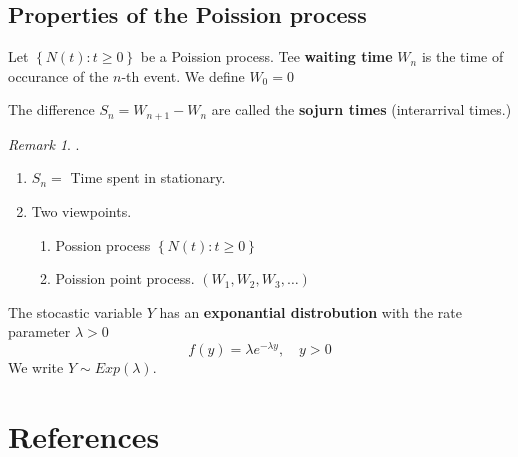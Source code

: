 \documentclass{article}
\theoremstyle{remark}
\newtheorem*{remark}{Remark}
\newcommand{\newpara}
  {
  \vskip 0.4cm
  }
\begin{document}
\subsection{Properties of the Poission process}%
\label{sub:properties_of_the_poission_process}

\begin{definition}
  Let $\left\{ N\left( t \right): t \ge 0 \right\}$ be a Poission process.  Tee \textbf{waiting time } $W_{n}$  is the time of occurance of the $n$-th event. We define $W_{0} = 0$
\end{definition}

\begin{definition}
  The difference $S_{n} = W_{n+1} - W_{n}$ are called the \textbf{sojurn times }  (interarrival times.)
\end{definition}

\begin{remark}.
 \newpara
  \begin{enumerate}[label=(\roman*)]
    \item $\displaystyle S_{n} = $ Time spent in stationary.
    \item Two viewpoints. 
    \begin{enumerate}[label=(\alph*)]
      \item Possion process $\left\{ N\left( t \right):  t\ge 0  \right\}$
      \item Poission point process. $\left( W_{1}, W_{2}, W_{3}, \ldots \right)$
    \end{enumerate}
  \end{enumerate}
\end{remark}

\begin{definition}
  The stocastic variable $Y$ has an \textbf{exponantial distrobution }  with the rate parameter $\lambda  > 0$ \[
  f\left( y \right) = \lambda  e^{-\lambda  y} , \quad  y>0  
  \] 
  We write $Y \sim Exp \left( \lambda  \right)$.
\end{definition}




\section{References}
\label{sec:references}





\end{document}
